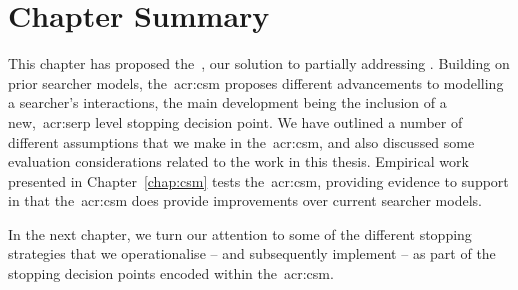 \section{Chapter Summary}
This chapter has proposed the~, our solution to partially addressing . Building on prior searcher models, the~\gls{acr:csm} proposes different advancements to modelling a searcher's interactions, the main development being the inclusion of a new,~\gls{acr:serp} level stopping decision point. We have outlined a number of different assumptions that we make in the~\gls{acr:csm}, and also discussed some evaluation considerations related to the work in this thesis. Empirical work presented in Chapter~\ref{chap:csm} tests the~\gls{acr:csm}, providing evidence to support  in that the~\gls{acr:csm} does provide improvements over current searcher models.

In the next chapter, we turn our attention to some of the different stopping strategies that we operationalise -- and subsequently implement -- as part of the stopping decision points encoded within the~\gls{acr:csm}.

\newpage
\thispagestyle{empty}
\mbox{}